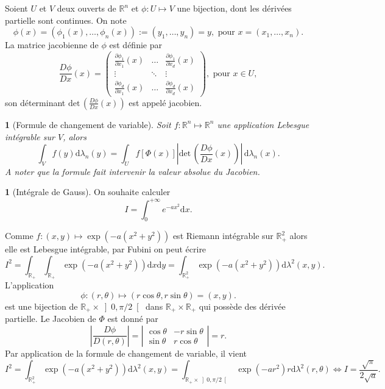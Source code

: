 \documentclass[8pt,notheorems]{beamer}
\def \R{\mathbb{R}}
\newtheorem{theorem}{\translate{Theorem}}[section]
\newtheorem{theorem}{\translate{Theoreme}}
\theoremstyle{definition}
\theoremstyle{example}
\newtheorem{example}{\translate{Exemple}}
\theoremstyle{mystyle}
\theoremstyle{plain}
\begin{document}
\begin{frame}[allowframebreaks]
Soient $U$ et $V$ deux ouverts de $\R^{n}$ et $\phi:U\mapsto V$ une bijection, dont les dérivées partielle sont continues. On note
$$
\phi(x)=(\phi_1(x),\ldots, \phi_n(x)) := (y_1,\ldots, y_n) =y , \text{ pour }x=(x_1,\ldots, x_n).
$$
La matrice jacobienne de $\phi$ est définie par
$$
\frac{D\phi}{Dx}(x)=\left(
\begin{array}{ccc}
\frac{\partial \phi_1}{\partial x_1}(x)&\ldots&\frac{\partial \phi_1}{\partial x_d}(x)\\
\vdots&\ddots&\vdots\\
\frac{\partial \phi_d}{\partial x_1}(x)&\ldots&\frac{\partial \phi_d}{\partial x_d}(x)
\end{array}
\right),\text{ pour }x\in U,
$$
son déterminant $\text{det}\,\left(\frac{D\phi}{Dx}(x)\right)$ est appelé jacobien.
\begin{theorem}[Formule de changement de variable]
Soit $f:\R^n\mapsto\R^n$ une application Lebesgue intégrable sur $V$, alors 
$$
\int_{V}f(y)\text{d}\lambda_n(y)=\int_{U}f[\Phi(x)]\left|\text{det}\,\left(\frac{D\phi}{Dx}(x)\right)\right|\,\text{d}\lambda_n(x).
$$
A noter que la formule fait intervenir la valeur absolue du Jacobien. 
\end{theorem}

\begin{example}[Intégrale de Gauss]
On souhaite calculer 
$$
I = \int_{0}^{+\infty}e^{-ax^2}\text{d}x.
$$

\end{example}
Comme $f:(x,y)\mapsto \exp\left(-a(x^{2}+y^{2})\right)$ est Riemann intégrable sur $\R_+^2$ alors elle est Lebesgue intégrable, par Fubini on peut écrire 
$$
I^2 = \int_{\R_+}\int_{\R_+} \exp\left(-a(x^{2}+y^{2})\right)\text{d}x\text{d}y =\int_{\R_+^2} \exp\left(-a(x^{2}+y^{2})\right)\text{d}\lambda^2(x,y).
$$
L'application 
$$
\phi:(r,\theta)\mapsto( r\cos\theta,r\sin\theta) = (x,y).
$$
est une bijection de $\R_+\times \left]0,\pi/2\right[$ dans $\R_+\times \R_+$  qui possède des dérivée partielle. Le Jacobien de $\Phi$ est donné par 
$$
\left|\frac{D\phi}{D(r,\theta)}\right|=\left|\begin{array}{cc}
\cos \theta & -r\sin\theta\\
\sin\theta &r\cos\theta\
\end{array}\right|=r.
$$
Par application de la formule de changement de variable, il vient
$$
I^2 = \int_{\R_+^2} \exp\left(-a(x^{2}+y^{2})\right)\text{d}\lambda^2(x,y) =\int_{\R_+\times \left]0,\pi/2\right[} \exp\left(-a r^2\right)r\text{d}\lambda^2(r,\theta)\Leftrightarrow I =\frac{\sqrt{\pi}}{2\sqrt{a}}.
$$

\end{frame}
\end{document}
